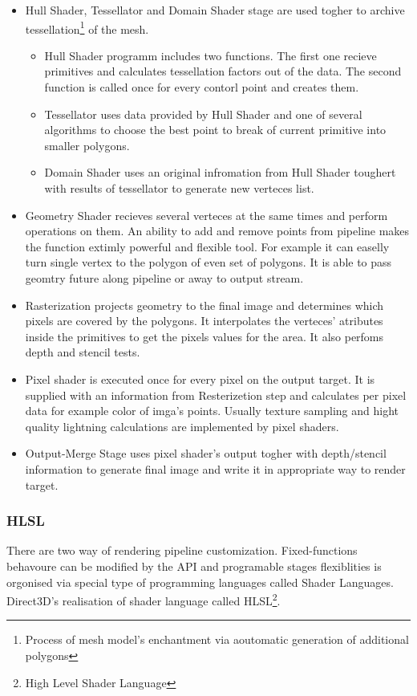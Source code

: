 \documentclass[twoside, english, 11pt]{report}
\begin{document}
\begin{itemize}
\item Hull Shader, Tessellator and Domain Shader stage are used togher to archive tessellation\footnote{Process of mesh model's enchantment via aoutomatic generation of additional polygons} of the mesh.
  \begin{itemize}
    \item Hull Shader programm includes two functions. The first one recieve primitives and calculates tessellation factors out of the data. The second function is called once for every contorl point and creates them.
    \item Tessellator uses data provided by Hull Shader and one of several algorithms to choose the best point to break of current primitive into smaller polygons.
    \item Domain Shader uses an original infromation from Hull Shader toughert with results of tessellator to generate new verteces list.
  \end{itemize}
\item Geometry Shader recieves several verteces at the same times and perform operations on them. An ability to add and remove points from pipeline makes the function extimly powerful and flexible tool. For example it can easelly turn single vertex to the polygon of even set of polygons. It is able to pass geomtry future along pipeline or away to output stream.
\item Rasterization projects geometry to the final image and determines which pixels are covered by the polygons. It interpolates the verteces' atributes inside the primitives to get the pixels values for the area. It also perfoms depth and stencil tests.
\item Pixel shader is executed once for every pixel on the output target. It is supplied with an information from Resterizetion step and calculates per pixel data for example color of imga's points. Usually texture sampling and hight quality lightning calculations are implemented by pixel shaders.
\item Output-Merge Stage uses pixel shader's output togher with depth/stencil information to generate final image and write it in appropriate way to render target.
\end{itemize}

\subsubsection{HLSL}
There are two way of rendering pipeline customization. Fixed-functions behavoure can be modified by the API and programable stages flexiblities is orgonised via special type of programming languages called Shader Languages. Direct3D's realisation of shader language called HLSL\footnote{High Level Shader Language}.\\
\end{document}
